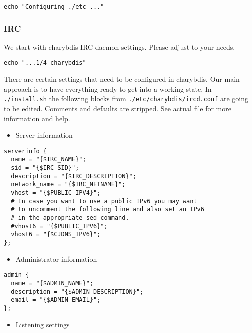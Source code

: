 \documentclass[12pt]{report}
\begin{document}
\begin{verbatim}
echo "Configuring ./etc ..."
\end{verbatim}


\subsubsection{IRC}\label{irc}

We start with charybdis IRC daemon settings. Please adjust to your
needs.

\begin{verbatim}
echo "...1/4 charybdis"
\end{verbatim}

There are certain settings that need to be configured in charybdis. Our
main approach is to have everything ready to get into a working state.
In \texttt{./install.sh} the following blocks from
\texttt{./etc/charybdis/ircd.conf} are going to be edited. Comments and
defaults are stripped. See actual file for more information and help.

\begin{itemize}

\item
  Server information
\end{itemize}

\begin{verbatim}
serverinfo {
  name = "{$IRC_NAME}";
  sid = "{$IRC_SID}";
  description = "{$IRC_DESCRIPTION}";
  network_name = "{$IRC_NETNAME}";
  vhost = "{$PUBLIC_IPV4}";
  # In case you want to use a public IPv6 you may want
  # to uncomment the following line and also set an IPv6
  # in the appropriate sed command.
  #vhost6 = "{$PUBLIC_IPV6}";
  vhost6 = "{$CJDNS_IPV6}";
};
\end{verbatim}

\begin{itemize}

\item
  Administrator information
\end{itemize}

\begin{verbatim}
admin {
  name = "{$ADMIN_NAME}";
  description = "{$ADMIN_DESCRIPTION}";
  email = "{$ADMIN_EMAIL}";
};
\end{verbatim}

\begin{itemize}

\item
  Listening settings
\end{itemize}
\end{document}
